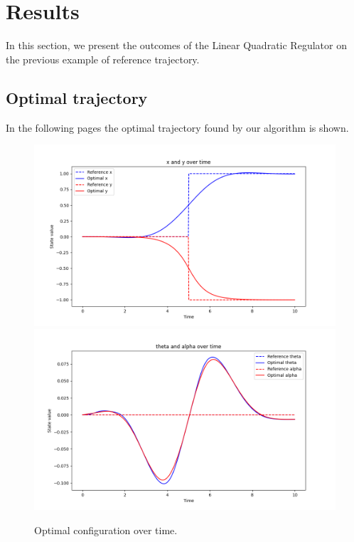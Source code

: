 \section{Results}
In this section, we present the outcomes of the Linear Quadratic Regulator on the previous example of reference trajectory.
\subsection{Optimal trajectory}
In the following pages the optimal trajectory found by our algorithm is shown.

\begin{figure}[H]
  \centering
  \includegraphics[width=1\textwidth]{pictures/x_y opt.png}\hfill \\
  \includegraphics[width=1\textwidth]{pictures/theta alpha opt.png}\hfill
  \caption{Optimal configuration over time.}
  \label{fig:Reference trajectory}
\end{figure}

